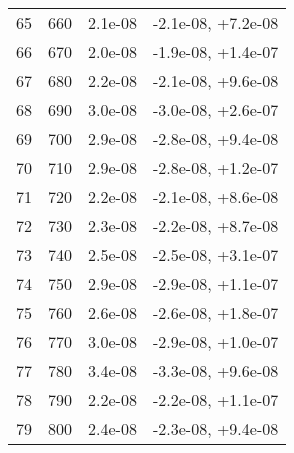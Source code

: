 \begin{table}
\begin{adjustbox}{width=1\textwidth/2}
\begin{tabular}{|c|c|c|c|}
\cline{1-4}
65 & 660 & 2.1e-08 & -2.1e-08, +7.2e-08 \\
\cline{1-4}
66 & 670 & 2.0e-08 & -1.9e-08, +1.4e-07 \\
\cline{1-4}
67 & 680 & 2.2e-08 & -2.1e-08, +9.6e-08 \\
\cline{1-4}
68 & 690 & 3.0e-08 & -3.0e-08, +2.6e-07 \\
\cline{1-4}
69 & 700 & 2.9e-08 & -2.8e-08, +9.4e-08 \\
\cline{1-4}
70 & 710 & 2.9e-08 & -2.8e-08, +1.2e-07 \\
\cline{1-4}
71 & 720 & 2.2e-08 & -2.1e-08, +8.6e-08 \\
\cline{1-4}
72 & 730 & 2.3e-08 & -2.2e-08, +8.7e-08 \\
\cline{1-4}
73 & 740 & 2.5e-08 & -2.5e-08, +3.1e-07 \\
\cline{1-4}
74 & 750 & 2.9e-08 & -2.9e-08, +1.1e-07 \\
\cline{1-4}
75 & 760 & 2.6e-08 & -2.6e-08, +1.8e-07 \\
\cline{1-4}
76 & 770 & 3.0e-08 & -2.9e-08, +1.0e-07 \\
\cline{1-4}
77 & 780 & 3.4e-08 & -3.3e-08, +9.6e-08 \\
\cline{1-4}
78 & 790 & 2.2e-08 & -2.2e-08, +1.1e-07 \\
\cline{1-4}
79 & 800 & 2.4e-08 & -2.3e-08, +9.4e-08 \\
\cline{1-4}
\end{tabular}
\end{adjustbox}
\end{table}

